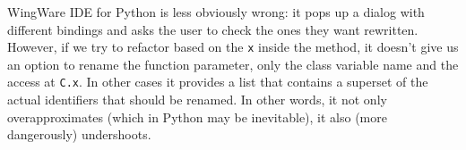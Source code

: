 \documentclass[10pt]{sigplanconf}
\newcommand{\postDoc}{}
\newcommand{\Scribtexttt}[1]{{\texttt{#1}}}
\begin{document}
WingWare IDE for Python is less obviously wrong: it pops up a dialog with
different bindings and asks the user to check the ones they want rewritten.
However, if we try to refactor based on the \Scribtexttt{x} inside the method, it
doesn{'}t give us an option to rename the function parameter, only the class
variable name and the access at \Scribtexttt{C{\hbox{\texttt{.}}}x}.  In other cases it provides a
list that contains a superset of the actual identifiers that should be renamed.
In other words, it not only overapproximates (which in Python may be
inevitable), it also (more dangerously) undershoots.

\postDoc
\end{document}
